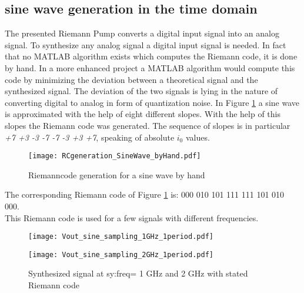 \subsection{sine wave generation in the time domain}
The presented Riemann Pump converts a digital input signal into an analog signal. 
To synthesize any analog signal a digital input signal is needed.  
In fact that no MATLAB algorithm exists which computes the Riemann code, it is done by hand. 
In a more enhanced project a MATLAB algorithm would compute this code by minimizing the deviation between a theoretical signal and the synthesized signal.
 The deviation of the two signals is lying in the nature of converting digital to analog in form of quantization noise. In Figure \ref{fig:SineWaveCodeGeneration} a sine wave is approximated with the help of eight different slopes. With the help of this slopes the Riemann code was generated. The sequence of slopes is in particular \textit{+7 +3 -3 -7 -7 -3 +3 +7}, speaking of absolute $i_0$ values.\\
 
 \begin{figure}[htb!]
   \centering
   \texttt{[image: RCgeneration\_SineWave\_byHand.pdf]}
   \caption{Riemanncode generation for a sine wave by hand}
   \label{fig:SineWaveCodeGeneration}
\end{figure}

The corresponding Riemann code of Figure \ref{fig:SineWaveCodeGeneration}  is: 000 010 101 111 111 101 010 000.
\\
This Riemann code is used for a few signals with different frequencies.

%




\begin{figure}
\centering
\begin{minipage}{.5\textwidth}
  \centering
  \texttt{[image: Vout\_sine\_sampling\_1GHz\_1period.pdf]}
  \label{fig:test1}
\end{minipage}%
\begin{minipage}{.5\textwidth}
  \centering
  \texttt{[image: Vout\_sine\_sampling\_2GHz\_1period.pdf]}
  \label{fig:test2}
  \caption{Synthesized signal at \gls{sy:freq}= 1 GHz and 2 GHz with stated Riemann code}
\end{minipage}
\end{figure}
















